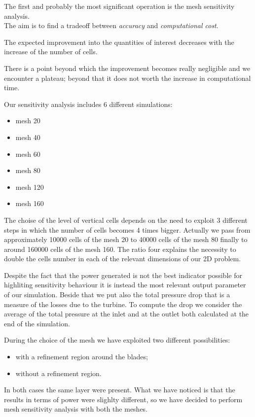 \documentclass[a4paper,12pt]{article}
\begin{document}
The first and probably the most significant operation is the mesh sensitivity analysis.
\\
The aim is to find a tradeoff between \emph{accuracy} and \emph{computational cost}. 

The expected improvement into the quantities of interest decreases with the increase of the number of cells.

There is a point beyond which the improvement becomes really negligible and we encounter a plateau; beyond that it does not worth the increase in computational time. 

Our sensitivity analysis includes 6 different simulations:
\begin{itemize}
\item mesh 20
\item mesh 40
\item mesh 60
\item mesh 80
\item mesh 120
\item mesh 160
\end{itemize}

The choise of the level of vertical cells depends on the need to exploit 3 different steps in which the number of cells becomes 4 times bigger. Actually we pass from approximately 10000 cells of the mesh 20 to 40000 cells of the mesh 80 finally to around 160000 cells of the mesh 160. 
The ratio four explains the necessity to double the cells number in each of the relevant dimensions of our 2D problem.

Despite the fact that the power generated is not the best indicator possible for highliting sensitivity behaviour it is instead the most relevant output parameter of our simulation.
Beside that we put also the total pressure drop that is a measure of the losses due to the turbine.
To compute the drop we consider the average of the total pressure at the inlet and at the outlet both calculated at the end of the simulation.

During the choice of the mesh we have exploited two different possibilities:
\begin{itemize}
\item with a refinement region around the blades;
\item without a refinement region.
\end{itemize}
In both cases the same layer were present.
What we have noticed is that the results in terms of power were slighlty different, so we have decided to perform mesh sensitivity analysis with both the meshes.
\end{document}
